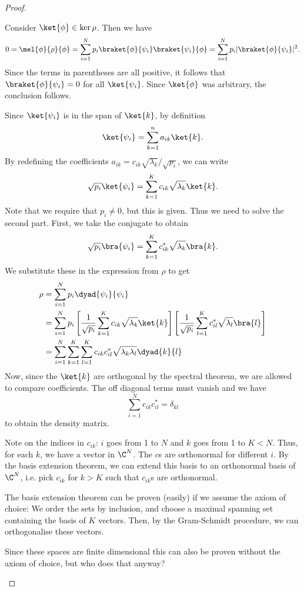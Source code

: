 \begin{proof}
\begin{parts}
		Consider $\ket{\phi}\in \ker\rho$. Then we have
		\[
			0 = \mel{\phi}{\rho}{\phi} = \sum_{i=1}^{N} p_i \braket{\phi}{\psi_i}\braket{\psi_i}{\phi} = \sum_{i=1}^N p_i |\braket{\phi}{\psi_i}|^2
		.\] 
		Since the terms in parentheses are all positive, it follows that $\braket{\phi}{\psi_i}=0$ for all $\ket{\psi_i}$. Since $\ket{\phi}$ was arbitrary, the conclusion follows.
	\item Since $\ket{\psi_i}$ is in the span of $\ket{k}$, by definition
		\[
			\ket{\psi_i} = \sum_{k=1}^n a_{ik}\ket{k}
		.\] 
		By redefining the coefficients $a_{ik} = c_{ik} \sqrt{\lambda_k}  / \sqrt{p_i} $, we can write
		\[
			\sqrt{p_i} \ket{\psi_i}  = \sum_{k=1}^K c_{ik} \sqrt{\lambda_k} \ket{k}
		.\] 
		Note that we require that $p_i \neq 0$, but this is given. Thus we need to solve the second part. First, we take the conjugate to obtain
		\[
			\sqrt{p_i} \bra{\psi_i} = \sum_{k=1}^K c_{ik}^* \sqrt{\lambda_k} \bra{k}
		.\] 
		We substitute these in the expression from $\rho$ to get
		\begin{align*}
			\rho &= \sum_{i=1}^N p_i \dyad{\psi_i}{\psi_i} \\
			     &= \sum_{i=1}^N p_i \left[ \frac{1}{\sqrt{p_i} }\sum_{k=1}^K c_{ik}\sqrt{\lambda_k} \ket{k} \right]\left[ \frac{1}{\sqrt{p_i} }\sum_{l=1}^K c_{il}^* \sqrt{\lambda_l}\bra{l}  \right]   \\
			     &= \sum_{i=1}^N\sum_{k=1}^K \sum_{l=1}^K c_{ik}c_{il}^* \sqrt{\lambda_k\lambda_l} \dyad{k}{l} 
		\end{align*}
		Now, since the $\ket{k}$ are orthogonal by the spectral theorem, we are allowed to compare coefficients. The off diagonal terms must vanish and we have
		\[
			\sum_{i=1}^N c_{ik}c_{il}^* = \delta_{kl}
		\]
		to obtain the density matrix.
	\item Note on the indices in $c_{ik}$: $i$ goes from 1 to $N$ and $k$ goes from 1 to $K<N$. Thus, for each $k$, we have a vector in $\C^N$. The $c$s are orthonormal for different $i$. By the basis extension theorem, we can extend this basis to an orthonormal basis of $\C^N$, i.e. pick $c_{ik}$ for $k>K$ such that $c_{ik}$s are orthonormal.

		The basis extension theorem can be proven (easily) if we assume the axiom of choice: We order the sets by inclusion, and choose a maximal spanning set containing the basis of $K$ vectors. Then, by the Gram-Schmidt procedure, we can orthogonalise these vectors. 

		Since these spaces are finite dimensional this can also be proven without the axiom of choice, but who does that anyway?


\end{parts}
\end{proof}
